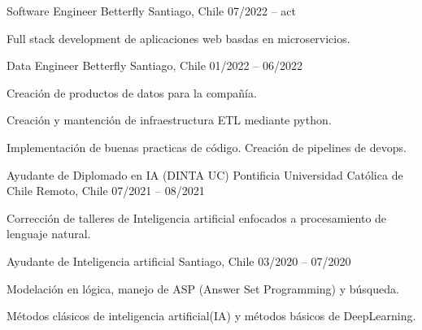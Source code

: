 

\begin{cventries}
\cventry
{Software Engineer} %
{Betterfly} %
{Santiago, Chile} %
{07/2022 – act} %
{
  \begin{cvitems} %
    \item {Full stack development de aplicaciones web basdas en microservicios.}
  \end{cvitems}
}
\cventry
  {Data Engineer} %
  {Betterfly} %
  {Santiago, Chile} %
  {01/2022 – 06/2022} %
  {
    \begin{cvitems} %
      \item {Creación de productos de datos para la compañía.}
      \item {Creación y mantención de infraestructura ETL mediante python.}
      \item {Implementación de buenas practicas de código. Creación de pipelines de devops.}
    \end{cvitems}
  }
\cventry
  {Ayudante de Diplomado en IA (DINTA UC)} %
  {Pontificia Universidad Católica de Chile} %
  {Remoto, Chile} %
  {07/2021 – 08/2021} %
  {
    \begin{cvitems} %
      \item {Corrección de talleres de Inteligencia artificial enfocados a procesamiento de lenguaje natural.}
    \end{cvitems}
  }
  \cventry
    {Ayudante de Inteligencia artificial} %
    {} %
    {Santiago, Chile} %
    {03/2020 – 07/2020} %
    {
      \begin{cvitems} %
        \item {Modelación en lógica, manejo de ASP (Answer Set Programming) y búsqueda.}
        \item {Métodos clásicos de inteligencia artificial(IA) y métodos básicos de DeepLearning.}
      \end{cvitems}
    }


\end{cventries}
